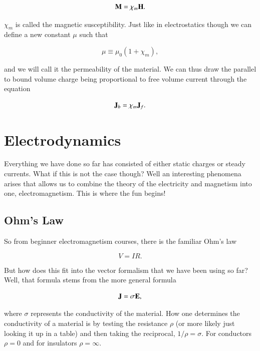 \documentclass[preprint, review,12pt]{elsarticle}
\def\b{\textbf}
\def\={\equiv}
\begin{document}
\begin{equation}
    \b M = \chi_m \b H.
\end{equation}

$\chi_m$ is called the magnetic susceptibility. Just like in electrostatics though we can define a new constant $\mu$ such that

\begin{equation}
    \mu \= \mu_0(1+\chi_m),
\end{equation}

and we will call it the permeability of the material. We can thus draw the parallel to bound volume charge being proportional to free volume current through the equation

\begin{equation}
    \b J_b = \chi_m \b J_f.
\end{equation}

\section{Electrodynamics}

Everything we have done so far has consisted of either static charges or steady currents. What if this is not the case though? Well an interesting phenomena arises that allows us to combine the theory of the electricity and magnetism into one, electromagnetism. This is where the fun begins!

\subsection{Ohm's Law}

So from beginner electromagnetism courses, there is the familiar Ohm's law

\begin{equation}
    V = IR.
\end{equation}

But how does this fit into the vector formalism that we have been using so far? Well, that formula stems from the more general formula

\begin{equation}
    \b J = \sigma \b E,
\end{equation}

where $\sigma$ represents the conductivity of the material. How one determines the conductivity of a material is by testing the resistance $\rho$ (or more likely just looking it up in a table) and then taking the reciprocal, $1/\rho = \sigma$. For conductors $\rho = 0$ and for insulators $\rho = \infty$.
\end{document}

